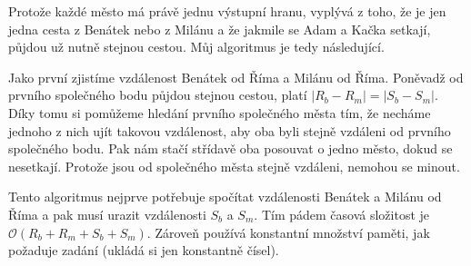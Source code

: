 \documentclass{fkssolpub}
\author{Ondřej Sedláček}
\begin{document}
Protože každé město má právě jednu výstupní hranu, vyplývá z toho, že je jen jedna cesta z Benátek nebo z Milánu a že jakmile se Adam a Kačka setkají, půjdou už nutně stejnou cestou. Můj algoritmus je tedy následující.

Jako první zjistíme vzdálenost Benátek od Říma a Milánu od Říma. Poněvadž od prvního společného bodu půjdou stejnou cestou, platí $|R_b - R_m| = |S_b - S_m|$. Díky tomu si pomůžeme hledání prvního společného města tím, že necháme jednoho z nich ujít takovou vzdálenost, aby oba byli stejně vzdáleni od prvního společného bodu. Pak nám stačí střídavě oba posouvat o jedno město, dokud se nesetkají. Protože jsou od společného města stejně vzdáleni, nemohou se minout.

Tento algoritmus nejprve potřebuje spočítat vzdálenosti Benátek a Milánu od Říma a pak musí urazit vzdálenosti $S_b$ a $S_m$. Tím pádem časová složitost je $\mathcal{O}(R_b + R_m + S_b + S_m)$. Zároveň používá konstantní množství paměti, jak požaduje zadání (ukládá si jen konstantně čísel).
\end{document}
